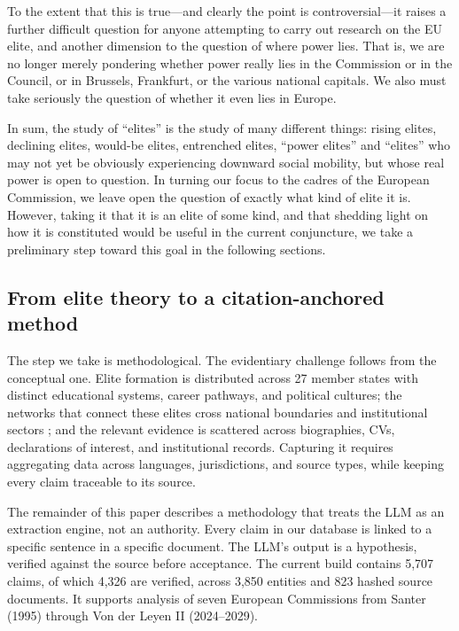 \documentclass[11pt,a4paper]{article}
\begin{document}
To the extent that this is true---and clearly the point is controversial---it raises a further difficult question for anyone attempting to carry out research on the EU elite, and another dimension to the question of where power lies. That is, we are no longer merely pondering whether power really lies in the Commission or in the Council, or in Brussels, Frankfurt, or the various national capitals. We also must take seriously the question of whether it even lies in Europe.

In sum, the study of ``elites'' is the study of many different things: rising elites, declining elites, would-be elites, entrenched elites, ``power elites'' and ``elites'' who may not yet be obviously experiencing downward social mobility, but whose real power is open to question. In turning our focus to the cadres of the European Commission, we leave open the question of exactly what kind of elite it is. However, taking it that it is an elite of some kind, and that shedding light on how it is constituted would be useful in the current conjuncture, we take a preliminary step toward this goal in the following sections.

\subsection{From elite theory to a citation-anchored method}

The step we take is methodological. The evidentiary challenge follows from the conceptual one. Elite formation is distributed across 27 member states with distinct educational systems, career pathways, and political cultures; the networks that connect these elites cross national boundaries and institutional sectors \cite{heemskerk2013}; and the relevant evidence is scattered across biographies, CVs, declarations of interest, and institutional records. Capturing it requires aggregating data across languages, jurisdictions, and source types, while keeping every claim traceable to its source.

The remainder of this paper describes a methodology that treats the LLM as an extraction engine, not an authority. Every claim in our database is linked to a specific sentence in a specific document. The LLM's output is a hypothesis, verified against the source before acceptance. The current build contains 5,707 claims, of which 4,326 are verified, across 3,850 entities and 823 hashed source documents. It supports analysis of seven European Commissions from Santer (1995) through Von der Leyen II (2024--2029).
\end{document}
